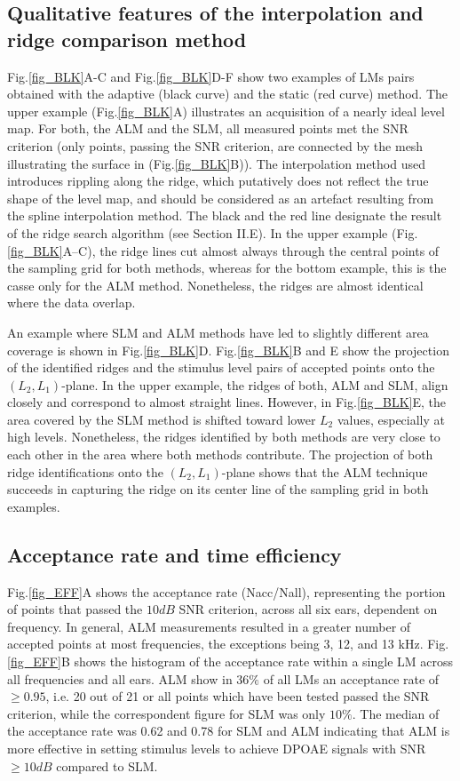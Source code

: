 \documentclass[journal,twoside,web]{ieeecolor2}
\begin{document}
\subsection{Qualitative features of the interpolation and ridge comparison method}
Fig.\ref{fig_BLK}A-C and Fig.\ref{fig_BLK}D-F show two examples of LMs pairs obtained with the adaptive (black curve) and the static (red curve) method.
The upper example (Fig.\ref{fig_BLK}A) illustrates an acquisition of a nearly ideal level map.
For both, the ALM and the SLM, all measured points met the SNR criterion (only points, passing the SNR criterion, are connected by the mesh illustrating the surface in (Fig.\ref{fig_BLK}B)).
The interpolation method used introduces rippling along the ridge, which putatively does not reflect the true shape of the level map, and should be considered as an artefact resulting from the spline interpolation method.
The black and the red line designate the result of the ridge search algorithm (see Section II.E).
In the upper example (Fig.\ref{fig_BLK}A–C), the ridge lines cut almost always through the central points of the sampling grid for both methods, whereas for the bottom example, this is the casse only for the ALM method. Nonetheless, the ridges are almost identical where the data overlap.


An example where SLM and ALM methods have led to slightly different area coverage is shown in Fig.\ref{fig_BLK}D.
Fig.\ref{fig_BLK}B and E show the projection of the identified ridges and the stimulus level pairs of accepted points onto the $(L_2, L_1)$-plane.
In the upper example, the ridges of both, ALM and SLM, align closely and correspond to almost straight lines.
However, in Fig.\ref{fig_BLK}E,  the area covered by the SLM method is shifted toward lower $L_2$ values, especially at high levels. Nonetheless, the ridges identified by both methods are very close to each other in the area where both methods contribute.
The projection of both ridge identifications onto the $(L_2, L_1)$-plane shows that the ALM technique succeeds in capturing the ridge on its center line of the sampling grid in both examples.

\subsection{Acceptance rate and time efficiency}
Fig.\ref{fig_EFF}A shows the acceptance rate (Nacc/Nall), representing the portion of points that passed the $10 dB$ SNR criterion, across all six ears, dependent on frequency.
In general, ALM measurements resulted in a greater number of accepted points at most frequencies, the exceptions being 3, 12, and 13 kHz.
Fig.\ref{fig_EFF}B shows the histogram of the acceptance rate within a single LM across all frequencies and all ears.
ALM show in $36\%$ of all LMs an acceptance rate of $\ge 0.95$, i.e. 20 out of 21 or all points which have been tested passed the SNR criterion, while the correspondent figure for SLM was only $10\%$.
The median of the acceptance rate was 0.62 and 0.78 for SLM and ALM indicating that ALM is more effective in setting stimulus levels to achieve DPOAE signals with SNR $\ge10 dB$ compared to SLM.
\end{document}
